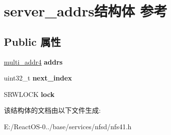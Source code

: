 \hypertarget{structserver__addrs}{}\section{server\+\_\+addrs结构体 参考}
\label{structserver__addrs}
\subsection*{Public 属性}
\begin{DoxyCompactItemize}
\item 
\mbox{\label{structserver__addrs_acd4b2eaac25911b98b25a378c48e4dd4}} 
\hyperlink{struct____multi__addr4}{multi\+\_\+addr4} {\bfseries addrs}
\item 
\mbox{\label{structserver__addrs_aa4329e60bd12c7facd2a0bbb15988649}} 
uint32\+\_\+t {\bfseries next\+\_\+index}
\item 
\mbox{\label{structserver__addrs_af796ad907d1d327a50b9f5e4679201ac}} 
S\+R\+W\+L\+O\+CK {\bfseries lock}
\end{DoxyCompactItemize}


该结构体的文档由以下文件生成\+:\begin{DoxyCompactItemize}
\item 
E\+:/\+React\+O\+S-\/0../base/services/nfsd/nfs41.\+h\end{DoxyCompactItemize}
